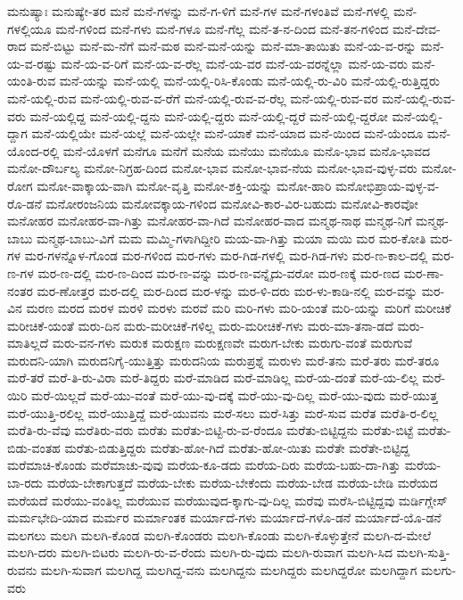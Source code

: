 {ಮನುಷ್ಯಾಃ
ಮನುಷ್ಯೇ-ತರ
ಮನೆ
ಮನೆ-ಗಳನ್ನು
ಮನೆ-ಗ-ಳಿಗೆ
ಮನೆ-ಗಳ
ಮನೆ-ಗಳಂತಿವೆ
ಮನೆ-ಗಳಲ್ಲಿ
ಮನೆ-ಗಳಲ್ಲಿಯೂ
ಮನೆ-ಗಳಿಂದ
ಮನೆ-ಗಳು
ಮನೆ-ಗಳೂ
ಮನೆ-ಗೆಲ್ಲ
ಮನೆ-ತ-ನ-ದಿಂದ
ಮನೆ-ತನ-ಗಳಿಂದ
ಮನೆ-ದೇವ-ರಾದ
ಮನೆ-ಬಿಟ್ಟು
ಮನೆ-ಮ-ನೆಗೆ
ಮನೆ-ಮಠ
ಮನೆ-ಮನೆ-ಯನ್ನು
ಮನೆ-ಮಾ-ತಾಯಿತು
ಮನೆ-ಯ-ವ-ರನ್ನು
ಮನೆ-ಯ-ವ-ರಷ್ಟು
ಮನೆ-ಯ-ವ-ರಿಗೆ
ಮನೆ-ಯ-ವ-ರೆಲ್ಲ
ಮನೆ-ಯ-ವರ
ಮನೆ-ಯ-ವರನ್ನೆಲ್ಲಾ
ಮನೆ-ಯ-ವರು
ಮನೆ-ಯಂತಿ-ರುವ
ಮನೆ-ಯನ್ನು
ಮನೆ-ಯಲ್ಲಿ
ಮನೆ-ಯಲ್ಲಿ-ರಿಸಿ-ಕೊಂಡು
ಮನೆ-ಯಲ್ಲಿ-ರು-ವಿರಿ
ಮನೆ-ಯಲ್ಲಿ-ರುತ್ತಿದ್ದರು
ಮನೆ-ಯಲ್ಲಿ-ರುವ
ಮನೆ-ಯಲ್ಲಿ-ರುವ-ವ-ರೆಗೆ
ಮನೆ-ಯಲ್ಲಿ-ರುವ-ವ-ರೆಲ್ಲ
ಮನೆ-ಯಲ್ಲಿ-ರುವ-ವರ
ಮನೆ-ಯಲ್ಲಿ-ರುವ-ವರು
ಮನೆ-ಯಲ್ಲಿದ್ದ
ಮನೆ-ಯಲ್ಲಿ-ದ್ದನು
ಮನೆ-ಯಲ್ಲಿ-ದ್ದರು
ಮನೆ-ಯಲ್ಲಿ-ದ್ದರೆ
ಮನೆ-ಯಲ್ಲಿ-ದ್ದರೋ
ಮನೆ-ಯಲ್ಲಿ-ದ್ದಾಗ
ಮನೆ-ಯಲ್ಲಿಯೇ
ಮನೆ-ಯಲ್ಲೆ
ಮನೆ-ಯಲ್ಲೇ
ಮನೆ-ಯಾಕೆ
ಮನೆ-ಯಾದ
ಮನೆ-ಯಿಂದ
ಮನೆ-ಯೆಂದೂ
ಮನೆ-ಯೊಂದ-ರಲ್ಲಿ
ಮನೆ-ಯೊಳಗೆ
ಮನೆಗೂ
ಮನೆಗೆ
ಮನೆಯ
ಮನೆಯು
ಮನೆಯೂ
ಮನೊ-ಭಾವ
ಮನೊ-ಭಾವದ
ಮನೋ-ದೌರ್ಬಲ್ಯ
ಮನೋ-ನಿಗ್ರಹ-ದಿಂದ
ಮನೋ-ಭಾವ
ಮನೋ-ಭಾವ-ನೆಯ
ಮನೋ-ಭಾವ-ವುಳ್ಳ-ವರು
ಮನೋ-ರೋಗ
ಮನೋ-ವಾಕ್ಕಾಯ-ವಾಗಿ
ಮನೋ-ವೃತ್ತಿ
ಮನೋ-ಶಕ್ತಿ-ಯನ್ನು
ಮನೋ-ಹಾರಿ
ಮನೋಭಿಪ್ರಾಯ-ವುಳ್ಳ-ವ-ರೊ-ಡನೆ
ಮನೋರಂಜನಿಯ
ಮನೋವಕ್ಕಾಯ-ಗಳಿಂದ
ಮನೋವಿ-ಕಾರ-ವಿರ-ಬಹುದು
ಮನೋವಿ-ಕಾರವೋ
ಮನೋಹರ
ಮನೋಹರ-ವಾ-ಗಿತ್ತು
ಮನೋಹರ-ವಾ-ಗಿದೆ
ಮನೋಹರ-ವಾದ
ಮನ್ಮಥ-ನಾಥ
ಮನ್ಮಥ-ನಿಗೆ
ಮನ್ಮಥ-ಬಾಬು
ಮನ್ಮಥ-ಬಾಬು-ವಿಗೆ
ಮಮ
ಮಮ್ಮಿ-ಗಳಾಗಿದ್ದೀರಿ
ಮಯ-ವಾ-ಗಿತ್ತು
ಮಯಾ
ಮಯಿ
ಮರ
ಮರ-ಕೋತಿ
ಮರ-ಗಳ
ಮರ-ಗಳನ್ನೊಳ-ಗೊಂಡ
ಮರ-ಗಳಿಂದ
ಮರ-ಗಳು
ಮರ-ಗಿಡ-ಗಳಲ್ಲಿ
ಮರ-ಗಿಡ-ಗಳು
ಮರ-ಣ-ಕಾಲ-ದಲ್ಲಿ
ಮರ-ಣ-ಗಳ
ಮರ-ಣ-ದಲ್ಲಿ
ಮರ-ಣ-ದಿಂದ
ಮರ-ಣ-ವನ್ನು
ಮರ-ಣ-ವನ್ನೈದು-ವರೋ
ಮರ-ಣಕ್ಕೆ
ಮರ-ಣದ
ಮರ-ಣಾ-ನಂತರ
ಮರ-ಣೋತ್ತರ
ಮರ-ದಲ್ಲಿ
ಮರ-ದಿಂದ
ಮರ-ಳನ್ನು
ಮರ-ಳಿ-ದರು
ಮರ-ಳು-ಕಾಡಿ-ನಲ್ಲಿ
ಮರ-ವನ್ನು
ಮರ-ವಿನ
ಮರಣ
ಮರದ
ಮರಳ
ಮರಳಿ
ಮರಳು
ಮರವೆ
ಮರಿ
ಮರಿ-ಗಳು
ಮರಿ-ಯಂತೆ
ಮರಿ-ಯನ್ನು
ಮರಿಗೆ
ಮರೀಚಿಕೆ
ಮರೀಚಿಕೆ-ಯಂತೆ
ಮರು-ದಿನ
ಮರು-ಮರೀಚಿಕೆ-ಗಳಿಲ್ಲ
ಮರು-ಮರೀಚಿಕೆ-ಗಳು
ಮರು-ಮಾ-ತನಾ-ಡದೆ
ಮರು-ಮಾತಿಲ್ಲದೆ
ಮರು-ವನ-ಗಳು
ಮರುಕ
ಮರುಕ್ಷಣ
ಮರುಕ್ಷಣವೇ
ಮರುಗ-ಬೇಕು
ಮರುಗು-ವಂತೆ
ಮರುಗುವೆ
ಮರುದನಿ-ಯಾಗಿ
ಮರುದನಿಗೈ-ಯುತ್ತಿತ್ತು
ಮರುದನಿಯ
ಮರುಪ್ರಶ್ನೆ
ಮರುಳು
ಮರೆ-ತನು
ಮರೆ-ತರು
ಮರೆ-ತರೂ
ಮರೆ-ತರೆ
ಮರೆ-ತಿ-ರು-ವಿರಾ
ಮರೆ-ತಿದ್ದರು
ಮರೆ-ಮಾಡಿದ
ಮರೆ-ಮಾಡಿಲ್ಲ
ಮರೆ-ಯ-ದಂತೆ
ಮರೆ-ಯ-ಲಿಲ್ಲ
ಮರೆ-ಯಿರಿ
ಮರೆ-ಯಿಲ್ಲದೆ
ಮರೆ-ಯು-ವಂತೆ
ಮರೆ-ಯು-ವು-ದಕ್ಕೆ
ಮರೆ-ಯು-ವು-ದಿಲ್ಲ
ಮರೆ-ಯು-ವುದು
ಮರೆ-ಯುತ್ತ
ಮರೆ-ಯುತ್ತಿ-ರಲಿಲ್ಲ
ಮರೆ-ಯುತ್ತಿದ್ದೆ
ಮರೆ-ಯುವನು
ಮರೆ-ಸಲು
ಮರೆ-ಸಿತ್ತು
ಮರೆ-ಸುವ
ಮರೆತ
ಮರೆತಿ-ರ-ಲಿಲ್ಲ
ಮರೆತಿ-ರು-ವೆವು
ಮರೆತಿರು-ವರು
ಮರೆತು
ಮರೆತು-ಬಿಟ್ಟಿ-ರು-ವ-ರೆಂದೂ
ಮರೆತು-ಬಿಟ್ಟಿದ್ದನು
ಮರೆತು-ಬಿಟ್ಟೆ
ಮರೆತು-ಬಿಡು-ವಂತಹ
ಮರೆತು-ಬಿಡುತ್ತಿದ್ದರು
ಮರೆತು-ಹೋ-ಗಿದೆ
ಮರೆತು-ಹೋ-ಯಿತು
ಮರೆತೇ
ಮರೆತೇ-ಬಿಟ್ಟಿದ್ದ
ಮರೆಮಾಚಿ-ಕೊಂಡು
ಮರೆಮಾಚು-ವುವು
ಮರೆಯ-ಕೂ-ಡದು
ಮರೆಯ-ದಿರು
ಮರೆಯ-ಬಹು-ದಾ-ಗಿತ್ತು
ಮರೆಯ-ಬಾ-ರದು
ಮರೆಯ-ಬೇಕಾಗುತ್ತದೆ
ಮರೆಯ-ಬೇಕು
ಮರೆಯ-ಬೇಕೆಂದು
ಮರೆಯ-ಬೇಡ
ಮರೆಯ-ಬೇಡಿ
ಮರೆಯದ
ಮರೆಯದೆ
ಮರೆಯು-ವಂತಿಲ್ಲ
ಮರೆಯುವ
ಮರೆಯುವುದ-ಕ್ಕಾಗು-ವು-ದಿಲ್ಲ
ಮರೆವು
ಮರೆಸಿ-ಬಿಟ್ಟಿದ್ದವು
ಮರ್ಡಿಗ್ಲೇಸ್
ಮರ್ಮಭೇದಿ-ಯಾದ
ಮರ್ಮರ
ಮರ್ಮಾಂತಕ
ಮರ್ಯಾದೆ-ಗಳು
ಮರ್ಯಾದೆ-ಗಳೊ-ಡನೆ
ಮರ್ಯಾದೆ-ಯೊ-ಡನೆ
ಮಲಗಲು
ಮಲಗಿ
ಮಲಗಿ-ಕೊಂಡ
ಮಲಗಿ-ಕೊಂಡರು
ಮಲಗಿ-ಕೊಂಡು
ಮಲಗಿ-ಕೊಳ್ಳುತ್ತೇನೆ
ಮಲಗಿ-ದ-ಮೇಲೆ
ಮಲಗಿ-ದರು
ಮಲಗಿ-ಬಿಟರು
ಮಲಗಿ-ರು-ವ-ರೆಂದು
ಮಲಗಿ-ರು-ವುದು
ಮಲಗಿ-ರುವಾಗ
ಮಲಗಿ-ಸಿದ
ಮಲಗಿ-ಸುತ್ತಿ-ರುವನು
ಮಲಗಿ-ಸುವಾಗ
ಮಲಗಿದ್ದ
ಮಲಗಿದ್ದ-ವನು
ಮಲಗಿದ್ದನು
ಮಲಗಿದ್ದರು
ಮಲಗಿದ್ದರೋ
ಮಲಗಿದ್ದಾಗ
ಮಲಗು-ವರು
}
